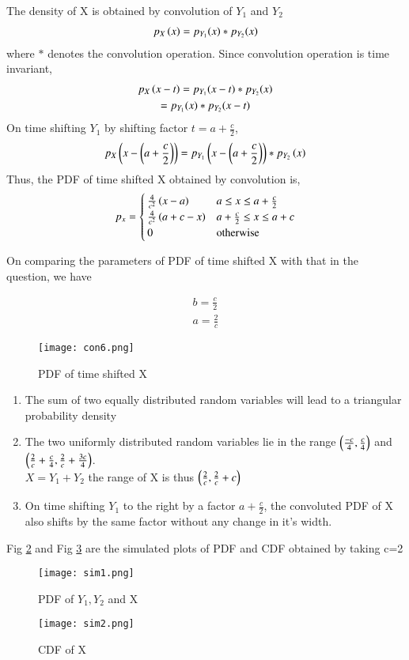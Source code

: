 \documentclass[journal,12pt,twocolumn]{IEEEtran}
\begin{document}
The density of X is obtained by convolution of $Y_1$ and $Y_2$
\begin{align}
p_X\left(x\right) = p_{Y_1}(x)*p_{Y_2}(x)
\end{align}
where $*$ denotes the convolution operation. Since convolution operation is time invariant, 
\begin{multline}
    p_X\left(x-t\right) = p_{Y_1}(x-t)*p_{Y_2}(x) \\ = p_{Y_1}(x)*p_{Y_2}(x-t)
\end{multline}
On time shifting $Y_1$ by shifting factor $t=a+\frac{c}{2}$, 
\begin{align}
    p_X\left(x-\left(a+\frac{c}{2}\right)\right) =  p_{Y_1}\left(x-\left(a+\frac{c}{2}\right)\right)*p_{Y_2}\left(x\right)
\end{align}
Thus, the PDF of time shifted X obtained by convolution is,
\begin{align}
p_x = 
\begin{cases}
\frac{4}{c^2}\left(x-a\right) & a \le x \le a+\frac{c}{2}\\
\frac{4}{c^2}\left(a+c-x\right) & a+\frac{c}{2} \le x \le a+c \\
0 & \text{otherwise}
\end{cases}
\end{align}

On comparing the parameters of PDF of time shifted X with that in the question, we have

\begin{align}
    b=\frac{c}{2}\\
    a=\frac{2}{c}
\end{align}
\begin{figure}[h!]
\centering
\texttt{[image: con6.png]}
\caption{PDF of time shifted X}
\label{fig:convolution}
\end{figure}

\begin{enumerate}
    \item The sum of two equally distributed random variables will lead to a triangular probability density
    \item The two uniformly distributed random variables lie in the range $\left(\frac{-c}{4},\frac{c}{4}\right)$ and $\left(\frac{2}{c}+\frac{c}{4} , \frac{2}{c}+\frac{3c}{4}\right)$. \\
    \because $X = Y_1 + Y_2$ the range of X is thus $\left(\frac{2}{c},\frac{2}{c}+c\right)$
    \item On time shifting $Y_1$ to the right by a factor $a+\frac{c}{2}$, the convoluted PDF of X also shifts by the same factor without any change in it's width.
\end{enumerate}

Fig \ref{fig:sim1} and Fig \ref{fig:sim2} are the simulated plots of PDF and CDF obtained by taking c=2
\begin{figure}[h!]
\centering
\texttt{[image: sim1.png]}
\caption{PDF of $Y_1, Y_2$ and X}
\label{fig:sim1}
\end{figure}
\begin{figure}[h!]
\centering
\texttt{[image: sim2.png]}
\caption{CDF of X}
\label{fig:sim2}
\end{figure}
\end{document}
